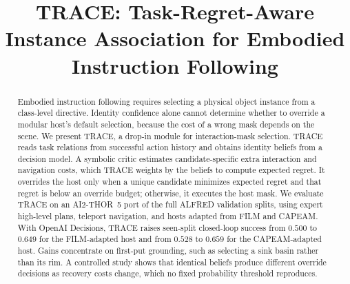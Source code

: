 \documentclass[conference]{IEEEtran}
\title{TRACE: Task-Regret-Aware Instance Association for Embodied Instruction Following
}
\author{
\IEEEauthorblockN{Jongwon Kim\textsuperscript{\textdagger}}
\IEEEauthorblockA{
\textit{Dept. of Energy Engineering} \\
\textit{Korea Institute of Energy Technology}\\
\orcidlink{0009-0008-5488-1727}~orcid.org/0009-0008-5488-1727}
\and
\IEEEauthorblockN{Seyong Ahn\textsuperscript{\textdagger}}
\IEEEauthorblockA{
\textit{Dept. of Electrical and Computer Engineering} \\
\textit{Stony Brook University, SUNY Korea}\\
\orcidlink{0009-0001-0261-0350}~orcid.org/0009-0001-0261-0350}
\linebreakand
\IEEEauthorblockN{Hoseong Ahn\textsuperscript{\textdagger}}
\IEEEauthorblockA{
\textit{Dept. of Intelligent Software} \\
\textit{Sungkyunkwan University}\\
\orcidlink{0009-0002-1809-5362}~orcid.org/0009-0002-1809-5362}
\and
\IEEEauthorblockN{Ryan Donghan Kwon\textsuperscript{\textdagger,*}}
\IEEEauthorblockA{
\textit{Dept. of Precision Medicine} \\
\textit{Sungkyunkwan University School of Medicine}\\
\orcidlink{0000-0003-3458-1301}~orcid.org/0000-0003-3458-1301}
}
\begin{document}
\maketitle
\begingroup
\renewcommand{\thefootnote}{\textdagger}
\renewcommand{\thefootnote}{*}
\endgroup

\begin{abstract}
Embodied instruction following requires selecting a physical object instance from a class-level directive.
Identity confidence alone cannot determine whether to override a modular host's default selection, because the cost of a wrong mask depends on the scene.
We present TRACE, a drop-in module for interaction-mask selection.
TRACE reads task relations from successful action history and obtains identity beliefs from a decision model.
A symbolic critic estimates candidate-specific extra interaction and navigation costs, which TRACE weights by the beliefs to compute expected regret.
It overrides the host only when a unique candidate minimizes expected regret and that regret is below an override budget; otherwise, it executes the host mask.
We evaluate TRACE on an AI2-THOR~5 port of the full ALFRED validation splits, using expert high-level plans, teleport navigation, and hosts adapted from FILM and CAPEAM.
With OpenAI Decisions, TRACE raises seen-split closed-loop success from $0.500$ to $0.649$ for the FILM-adapted host and from $0.528$ to $0.659$ for the CAPEAM-adapted host. %
Gains concentrate on first-put grounding, such as selecting a sink basin rather than its rim.
A controlled study shows that identical beliefs produce different override decisions as recovery costs change, which no fixed probability threshold reproduces.
\end{abstract}
\end{document}
